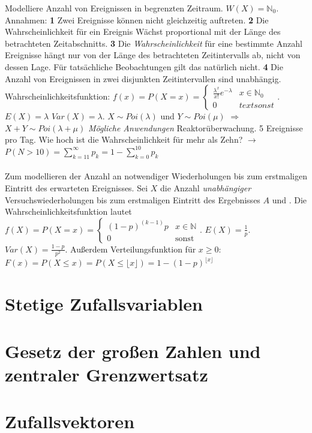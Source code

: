  Modelliere Anzahl von Ereignissen in begrenzten Zeitraum. $W(X) = \mathds{N}_0$. Annahmen: \textbf{1} Zwei Ereignisse können nicht gleichzeitig auftreten. \textbf{2} Die Wahrscheinlichkeit für ein Ereignis Wächst proportional mit der Länge des betrachteten Zeitabschnitts. \textbf{3} Die \emph{Wahrscheinlichkeit} für eine bestimmte Anzahl Ereignisse hängt nur von der Länge des betrachteten Zeitintervalls ab, nicht von dessen Lage. Für tatsächliche Beobachtungen gilt das natürlich nicht. \textbf{4} Die Anzahl von Ereignissen in zwei disjunkten Zeitintervallen sind unabhängig. Wahrscheinlichkeitsfunktion: $f(x) = P(X=x) = \begin{cases}
    \frac{\lambda^x}{x!}e^{-\lambda} & x \in \mathds{N}_0\\
    0 & text{sonst}
\end{cases}$. $E(X) = \lambda$ $Var(X) = \lambda$. $X \sim Poi(\lambda)$ und $Y \sim Poi(\mu)$ $\Rightarrow$ $X + Y \sim Poi(\lambda + \mu)$ \emph{Mögliche Anwendungen} Reaktorüberwachung. 5 Ereignisse pro Tag. Wie hoch ist die Wahrscheinlichkeit für mehr als Zehn? $\rightarrow$ $P(N > 10) = \sum_{k=11}^\infty p_k = 1 - \sum_{k=0}^{10}p_k$ \\\\
 Zum modellieren der Anzahl an notwendiger Wiederholungen bis zum erstmaligen Eintritt des erwarteten Ereignisses. Sei $X$ die Anzahl \emph{unabhängiger} Versuchswiederholungen bis zum erstmaligen Eintritt des Ergebnisses $A$ und . Die Wahrscheinlichkeitsfunktion lautet $f(X) = P(X = x) = \begin{cases}
    (1 - p) ^ (k-1) p & x \in \mathds{N}\\
    0 & \text{sonst}
\end{cases}$. $E(X) = \frac{1}{p}$. $Var(X) = \frac{1-p}{p^2}$. Außerdem Verteilungsfunktion für $x \ge 0$: $F(x) = P(X \le x) = P(X \le \lfloor x\rfloor) = 1 - (1 - p)^{\lfloor x\rfloor}$



\section{Stetige Zufallsvariablen}
\section{Gesetz der großen Zahlen und zentraler Grenzwertsatz}
\section{Zufallsvektoren}

